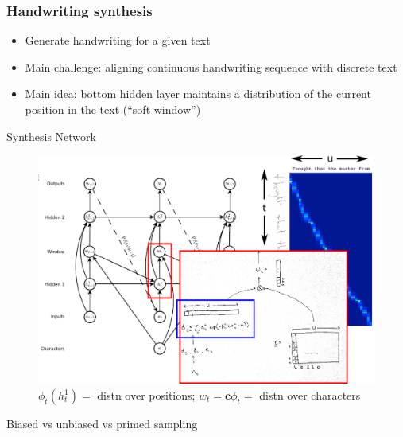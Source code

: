 \documentclass[10pt,xcolor=dvipsnames]{beamer}
\begin{document}
\begin{frame}
  \frametitle{Handwriting synthesis}
  \begin{itemize}
  \item Generate handwriting for a given text
  \item Main challenge: aligning continuous handwriting sequence with discrete text
  \item Main idea: bottom hidden layer maintains a distribution of the current position
    in the text (``soft window'')
  \end{itemize}
\end{frame}

\begin{frame}{Synthesis Network}
  \begin{figure}
    \centering
  \includegraphics[width=.9\linewidth]{fig/synthesis_network3.png}
    \caption{$\phi_t(h_t^1) = $ distn over positions; $w_t = \mathbf{c}
      \phi_t =$ distn over characters}
    \label{fig:synthesis-network}
  \end{figure}
\end{frame}

\begin{frame}
  Biased vs unbiased vs primed sampling
\end{frame}
\end{document}
